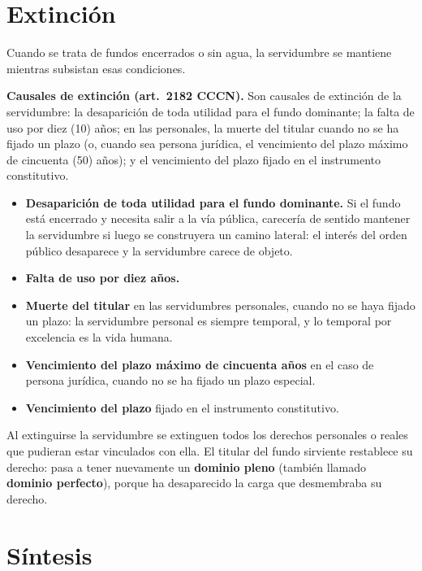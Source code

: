 \documentclass[12pt,oneside]{book}
\begin{document}
\section{Extinción}

Cuando se trata de fundos encerrados o sin agua, la servidumbre se mantiene mientras subsistan esas condiciones.

\begin{importante}
\textbf{Causales de extinción (art.~2182 CCCN).} Son causales de extinción de la servidumbre: la desaparición de toda utilidad para el fundo dominante; la falta de uso por diez (10) años; en las personales, la muerte del titular cuando no se ha fijado un plazo (o, cuando sea persona jurídica, el vencimiento del plazo máximo de cincuenta (50) años); y el vencimiento del plazo fijado en el instrumento constitutivo.
\end{importante}

\begin{itemize}
    \item \textbf{Desaparición de toda utilidad para el fundo dominante.} Si el fundo está encerrado y necesita salir a la vía pública, carecería de sentido mantener la servidumbre si luego se construyera un camino lateral: el interés del orden público desaparece y la servidumbre carece de objeto.
    \item \textbf{Falta de uso por diez años.}
    \item \textbf{Muerte del titular} en las servidumbres personales, cuando no se haya fijado un plazo: la servidumbre personal es siempre temporal, y lo temporal por excelencia es la vida humana.
    \item \textbf{Vencimiento del plazo máximo de cincuenta años} en el caso de persona jurídica, cuando no se ha fijado un plazo especial.
    \item \textbf{Vencimiento del plazo} fijado en el instrumento constitutivo.
\end{itemize}

Al extinguirse la servidumbre se extinguen todos los derechos personales o reales que pudieran estar vinculados con ella. El titular del fundo sirviente restablece su derecho: pasa a tener nuevamente un \textbf{dominio pleno} (también llamado \textbf{dominio perfecto}), porque ha desaparecido la carga que desmembraba su derecho.

\section{Síntesis}
\end{document}
